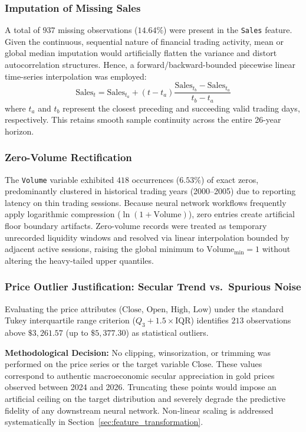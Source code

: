 \documentclass[conference]{IEEEtran}
\begin{document}
\subsubsection{Imputation of Missing Sales}
A total of $937$ missing observations ($14.64\%$) were present in the \texttt{Sales} feature. Given the continuous, sequential nature of financial trading activity, mean or global median imputation would artificially flatten the variance and distort autocorrelation structures. Hence, a forward/backward-bounded piecewise linear time-series interpolation was employed:
\begin{equation}
    \text{Sales}_t = \text{Sales}_{t_a} + (t - t_a) \frac{\text{Sales}_{t_b} - \text{Sales}_{t_a}}{t_b - t_a}
\end{equation}
where $t_a$ and $t_b$ represent the closest preceding and succeeding valid trading days, respectively. This retains smooth sample continuity across the entire 26-year horizon.

\subsubsection{Zero-Volume Rectification}
The \texttt{Volume} variable exhibited $418$ occurrences ($6.53\%$) of exact zeros, predominantly clustered in historical trading years (2000--2005) due to reporting latency on thin trading sessions. Because neural network workflows frequently apply logarithmic compression ($\ln(1 + \text{Volume})$), zero entries create artificial floor boundary artifacts. Zero-volume records were treated as temporary unrecorded liquidity windows and resolved via linear interpolation bounded by adjacent active sessions, raising the global minimum to $\text{Volume}_{\min} = 1$ without altering the heavy-tailed upper quantiles.

\subsubsection{Price Outlier Justification: Secular Trend vs.\ Spurious Noise}
Evaluating the price attributes ($\text{Close}$, $\text{Open}$, $\text{High}$, $\text{Low}$) under the standard Tukey interquartile range criterion ($Q_3 + 1.5 \times \text{IQR}$) identifies $213$ observations above $\$3{,}261.57$ (up to $\$5{,}377.30$) as statistical outliers.

\textbf{Methodological Decision:} No clipping, winsorization, or trimming was performed on the price series or the target variable $\text{Close}$. These values correspond to authentic macroeconomic secular appreciation in gold prices observed between 2024 and 2026. Truncating these points would impose an artificial ceiling on the target distribution and severely degrade the predictive fidelity of any downstream neural network. Non-linear scaling is addressed systematically in Section~\ref{sec:feature_transformation}.
\end{document}
